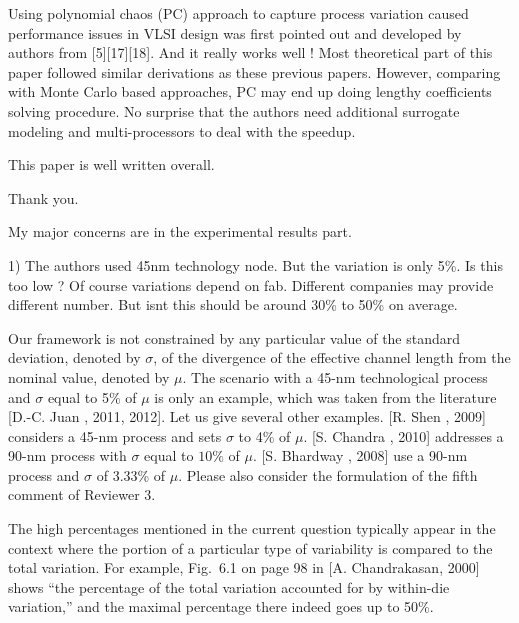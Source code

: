 \begin{reviewer}
Using polynomial chaos (PC) approach to capture process variation caused performance issues in VLSI design was first pointed out and developed by authors from [5][17][18]. And it really works well ! Most theoretical part of this paper followed similar derivations as these previous papers. However, comparing with Monte Carlo based approaches, PC may end up doing  lengthy  coefficients solving procedure. No surprise that the authors need additional surrogate modeling and multi-processors to deal with the speedup.

This paper is well written overall.
\end{reviewer}
\begin{authors}
Thank you.
\end{authors}

\begin{reviewer}
My major concerns are in the experimental results part.

1) The authors used 45nm technology node. But the variation is only 5\%. Is this too low ? Of course variations depend on fab. Different companies may provide different number. But isnt this should be around 30\% to 50\% on average.
\end{reviewer}
\begin{authors}
Our framework is not constrained by any particular value of the standard deviation, denoted by $\sigma$, of the divergence of the effective channel length from the nominal value, denoted by $\mu$.
The scenario with a 45-nm technological process and $\sigma$ equal to 5\% of $\mu$ is only an example, which was taken from the literature [D.-C. Juan \etal, 2011, 2012].
Let us give several other examples.
[R. Shen \etal, 2009] considers a 45-nm process and sets $\sigma$ to 4\% of $\mu$.
[S. Chandra \etal, 2010] addresses a 90-nm process with $\sigma$ equal to $10\%$ of $\mu$.
[S. Bhardway \etal, 2008] use a 90-nm process and $\sigma$ of 3.33\% of $\mu$.
Please also consider the formulation of the fifth comment of Reviewer 3.

The high percentages mentioned in the current question typically appear in the context where the portion of a particular type of variability is compared to the total variation.
For example, Fig.~6.1 on page 98 in [A. Chandrakasan, 2000] shows ``the percentage of the total variation accounted for by within-die variation,'' and the maximal percentage there indeed goes up to 50\%.

\end{authors}

